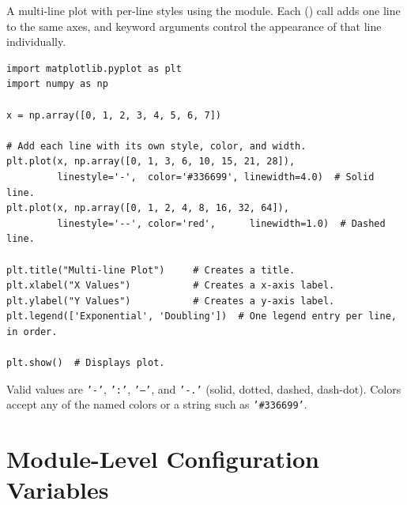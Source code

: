 A multi-line plot with per-line styles using the  module. Each () call adds one line to the same axes, and keyword arguments control the appearance of that line individually.
\begin{lstlisting}
import matplotlib.pyplot as plt
import numpy as np

x = np.array([0, 1, 2, 3, 4, 5, 6, 7])

# Add each line with its own style, color, and width.
plt.plot(x, np.array([0, 1, 3, 6, 10, 15, 21, 28]),
         linestyle='-',  color='#336699', linewidth=4.0)  # Solid line.
plt.plot(x, np.array([0, 1, 2, 4, 8, 16, 32, 64]),
         linestyle='--', color='red',      linewidth=1.0)  # Dashed line.

plt.title("Multi-line Plot")     # Creates a title.
plt.xlabel("X Values")           # Creates a x-axis label.
plt.ylabel("Y Values")           # Creates a y-axis label.
plt.legend(['Exponential', 'Doubling'])  # One legend entry per line, in order.

plt.show()  # Displays plot.
\end{lstlisting}
Valid  values are \texttt{'-'}, \texttt{':'}, \texttt{'--'}, and \texttt{'-.'} (solid, dotted, dashed, dash-dot). Colors accept any of the named colors or a  string such as \texttt{'\#336699'}.













\section{Module-Level Configuration Variables}

